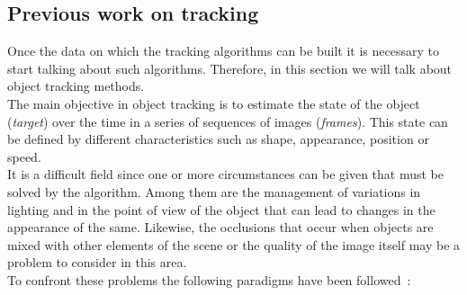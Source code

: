 \subsection{Previous work on tracking}
Once the data on which the tracking algorithms can be built it is necessary to start talking about such algorithms. Therefore, in this section we will talk about object tracking methods.\\
The main objective in object tracking is to estimate the state of the object (\textit{target}) over the time in a series of sequences of images (\textit{frames}). This state can be defined by different characteristics such as shape, appearance, position or speed.\\
It is a difficult field since one or more circumstances can be given that must be solved by the algorithm. Among them are the management of variations in lighting and in the point of view of the object that can lead to changes in the appearance of the same. Likewise, the occlusions that occur when objects are mixed with other elements of the scene or the quality of the image itself may be a problem to consider in this area.\\
To confront these problems the following paradigms have been followed~\cite{smeulders2014visual}:
